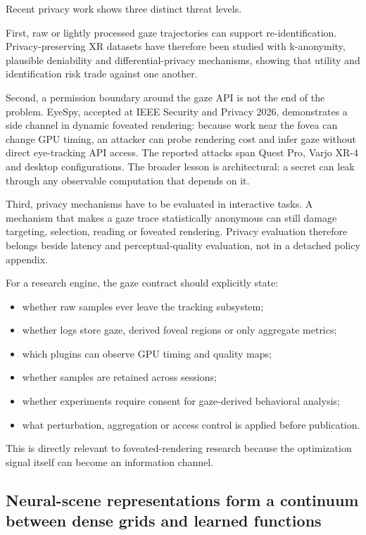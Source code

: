 Recent privacy work shows three distinct threat levels.

First, raw or lightly processed gaze trajectories can support re-identification. Privacy-preserving XR datasets have therefore been studied with k-anonymity, plausible deniability and differential-privacy mechanisms, showing that utility and identification risk trade against one another.

Second, a permission boundary around the gaze API is not the end of the problem. EyeSpy, accepted at IEEE Security and Privacy 2026, demonstrates a side channel in dynamic foveated rendering: because work near the fovea can change GPU timing, an attacker can probe rendering cost and infer gaze without direct eye-tracking API access. The reported attacks span Quest Pro, Varjo XR-4 and desktop configurations. The broader lesson is architectural: a secret can leak through any observable computation that depends on it.

Third, privacy mechanisms have to be evaluated in interactive tasks. A mechanism that makes a gaze trace statistically anonymous can still damage targeting, selection, reading or foveated rendering. Privacy evaluation therefore belongs beside latency and perceptual-quality evaluation, not in a detached policy appendix.

For a research engine, the gaze contract should explicitly state:

\begin{itemize}
\tightlist
\item
  whether raw samples ever leave the tracking subsystem;
\item
  whether logs store gaze, derived foveal regions or only aggregate metrics;
\item
  which plugins can observe GPU timing and quality maps;
\item
  whether samples are retained across sessions;
\item
  whether experiments require consent for gaze-derived behavioral analysis;
\item
  what perturbation, aggregation or access control is applied before publication.
\end{itemize}

This is directly relevant to foveated-rendering research because the optimization signal itself can become an information channel.

\subsection{Neural-scene representations form a continuum between dense grids and learned functions}\label{neural-scene-representations-form-a-continuum-between-dense-grids-and-learned-functions}

